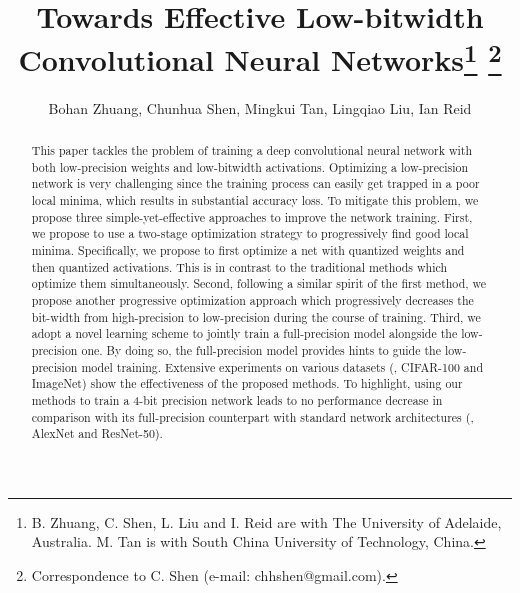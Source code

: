 \documentclass[10pt,twocolumn,letterpaper]{article}
\begin{document}
%
\title{Towards Effective Low-bitwidth Convolutional Neural Networks\thanks{B. Zhuang, C. Shen, L. Liu and I. Reid are with The University of Adelaide,
  Australia. M. Tan is with South China University of Technology, China.}
  \thanks{Correspondence to C. Shen (e-mail: chhshen@gmail.com).}
%
}

\author{
Bohan Zhuang, Chunhua Shen,
Mingkui Tan, Lingqiao Liu,  Ian Reid
}




\maketitle


\begin{abstract}
	This paper tackles the problem of training a deep convolutional neural network with both low-precision weights and low-bitwidth activations. Optimizing a low-precision network is very challenging since the training process can easily get trapped in a poor local minima, which results in substantial accuracy loss. To mitigate this problem, we propose three simple-yet-effective approaches to improve the network training.
	First, we propose to use a two-stage optimization strategy to progressively find good local minima. Specifically, we propose to first optimize a net with quantized weights and then quantized activations. This is in contrast to the traditional methods which optimize them simultaneously.
	Second, following a similar spirit of the first method, we propose another progressive optimization approach which progressively decreases the bit-width from high-precision to low-precision during the course of training.
	Third, we adopt a novel learning scheme to jointly train a full-precision model alongside the low-precision one. By doing so, the full-precision model provides hints to guide the low-precision model training.
	Extensive experiments on various datasets (\ie, CIFAR-100 and ImageNet) show the effectiveness of the proposed methods. To highlight, using our methods to train a 4-bit precision network leads to no performance decrease in comparison with its full-precision counterpart with standard network architectures (\ie, AlexNet and ResNet-50).


\end{abstract}


\tableofcontents
\clearpage





	
	
\end{document}
